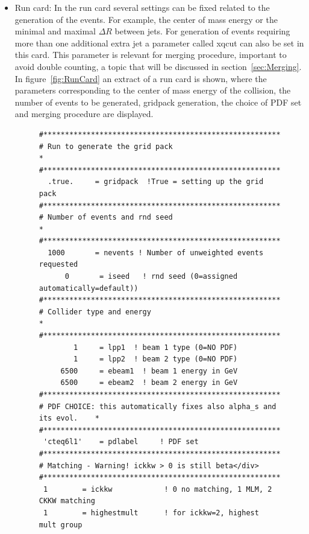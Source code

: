 \begin{itemize}
  \item Run card: In the run card several settings can be fixed related to the generation of the events. For example, the center of mass energy or the minimal and maximal $\Delta R$ between jets. For generation of events requiring more than one additional extra jet a parameter called xqcut can also be set in this card. This parameter is relevant for merging procedure, important to avoid double counting, a topic that will be discussed in section~\ref{sec:Merging}. In figure~\ref{fig:RunCard} an extract of a run card is shown, where the parameters corresponding to the center of mass energy of the collision, the number of events to be generated, gridpack generation, the choice of PDF set and merging procedure are displayed.
    \begin{figure}[!Hhtbp]
      \begin{center}
        \begin{minipage}[c]{0.7\textwidth}
\scriptsize
\begin{verbatim}
#*********************************************************************
# Run to generate the grid pack                                      *
#*********************************************************************
  .true.     = gridpack  !True = setting up the grid pack
#*********************************************************************
# Number of events and rnd seed                                      *
#*********************************************************************
  1000       = nevents ! Number of unweighted events requested 
      0       = iseed   ! rnd seed (0=assigned automatically=default))
#*********************************************************************
# Collider type and energy                                           *
#*********************************************************************
        1     = lpp1  ! beam 1 type (0=NO PDF)
        1     = lpp2  ! beam 2 type (0=NO PDF)
     6500     = ebeam1  ! beam 1 energy in GeV
     6500     = ebeam2  ! beam 2 energy in GeV
#*********************************************************************
# PDF CHOICE: this automatically fixes also alpha_s and its evol.    *
#*********************************************************************
 'cteq6l1'    = pdlabel     ! PDF set  
#*********************************************************************
# Matching - Warning! ickkw > 0 is still beta</div>
#*********************************************************************
 1        = ickkw            ! 0 no matching, 1 MLM, 2 CKKW matching
 1        = highestmult      ! for ickkw=2, highest mult group

\end{verbatim}
\end{minipage}
\end{center}
\end{figure}
\end{itemize}
